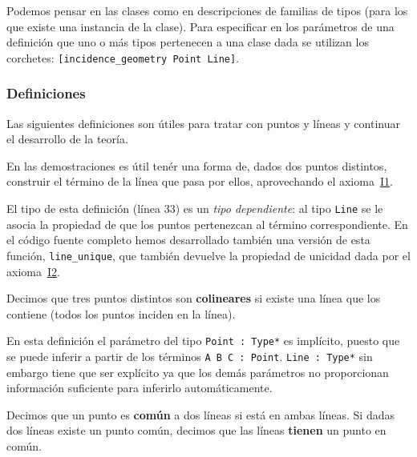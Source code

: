 Podemos pensar en las clases como en descripciones de familias de tipos (para
los que existe una instancia de la clase). Para especificar en los
parámetros de una definición que uno o más tipos pertenecen a una clase dada se
utilizan los corchetes: \lstinline{[incidence_geometry Point Line]}.

\subsubsection{Definiciones}

Las siguientes definiciones son útiles para tratar con puntos y líneas y
continuar el desarrollo de la teoría.

En las demostraciones es útil tenér una forma de, dados dos puntos distintos,
construir el término de la línea que pasa por ellos, aprovechando el
axioma~\hyperref[ax:I1]{I1}.


El tipo de esta definición (línea 33) es un \textit{tipo dependiente}: al tipo
\lstinline{Line} se le asocia la propiedad de que los puntos pertenezcan al
término correspondiente. En el código fuente completo hemos desarrollado también
una versión de esta función, \lstinline{line_unique}, que también devuelve la
propiedad de unicidad dada por el axioma~\hyperref[ax:I2]{I2}.

\begin{defin*}[Colinearidad]
	Decimos que tres puntos distintos son \textbf{colineares} si existe una
	línea que los contiene (todos los puntos inciden en la línea).
\end{defin*}


En esta definición el parámetro del tipo \lstinline{Point : Type*} es implícito,
puesto que se puede inferir a partir de los términos \lstinline{A B C : Point}.
\lstinline{Line : Type*} sin embargo tiene que ser explícito ya que los demás
parámetros no proporcionan información suficiente para inferirlo
automáticamente.

\begin{defin*}
	Decimos que un punto es \textbf{común} a dos líneas si está en ambas líneas.
	Si dadas dos líneas existe un punto común, decimos que las líneas
	\textbf{tienen} un punto en común.
\end{defin*}


